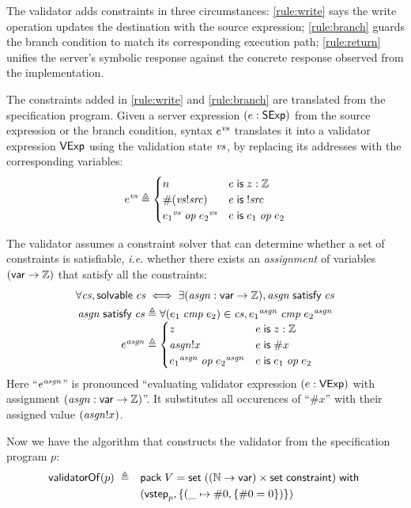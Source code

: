 The validator adds constraints in three circumstances: \autoref{rule:write} says
the write operation updates the destination with the source expression;
\autoref{rule:branch} guards the branch condition to match its corresponding
execution path; \autoref{rule:return} unifies the server's symbolic response
against the concrete response observed from the implementation.

The constraints added in \autoref{rule:write} and \autoref{rule:branch} are
translated from the specification program.  Given a server expression
$(e:\mathsf{SExp})$ from the source expression or the branch condition, syntax $e^{\mathit{vs}}$
translates it into a validator expression $\mathsf{VExp}$ using the validation state
$\mathit{vs}$, by replacing its addresses with the corresponding variables:
\[e^{\mathit{vs}}\triangleq\begin{cases}
  n&e\;\mathsf{is}\; z:\mathbb Z\\
  \#(\mathit{vs}!\mathit{src})&e\;\mathsf{is}\;!\mathit{src}\\
  {e_1}^{\mathit{vs}}\;\mathit{op}\;{e_2}^{\mathit{vs}}&e\;\mathsf{is}\; e_1\;\mathit{op}\; e_2
\end{cases}\]

The validator assumes a constraint solver that can determine whether a set of
constraints is satisfiable, {\it i.e.} whether there exists an {\em assignment}
of variables $(\mathsf{var}\to\mathbb Z)$ that satisfy all the constraints:
\begin{gather*}
  \forall \cs,\solvable \cs\iff\exists (\asgn:\Var\to\Int),\satisfy{\asgn}\cs\\
  \begin{array}{r@{\;}l}
    \satisfy{\asgn}\cs\triangleq&\forall(e_1\ccmp e_2)\in \cs, {e_1}^{\asgn}\ccmp{e_2}^{\asgn}\\
    e^{\asgn}\triangleq&\begin{cases}
      z&e\Is z:\Int\\
      \asgn!x&e\Is \#x\\
      {e_1}^{\asgn}\oop{e_2}^{\asgn}&e\Is e_1\oop e_2
    \end{cases}
  \end{array}
\end{gather*}
Here ``$e^{\mathit{asgn}}$'' is pronounced ``evaluating validator expression $(e:\mathsf{VExp})$
with assignment $(\mathit{asgn}:\mathsf{var}\to\mathbb Z)$''.  It substitutes all occurences of
``$\#x$'' with their assigned value $(\mathit{asgn}!x)$.

Now we have the algorithm that constructs the validator from the specification
program $p$:
\begin{align*}\mathsf{validatorOf}(p)\;\triangleq\quad&\mathsf{pack}\;V=\mathsf{set}\;((\mathbb N\to\mathsf{var})\times\mathsf{set}\;\mathsf{constraint})\;\mathsf{with}\;\\
  &(\mathsf{vstep}_p,\{(\_\mapsto\#0,\{\#0=0\})\})
\end{align*}

